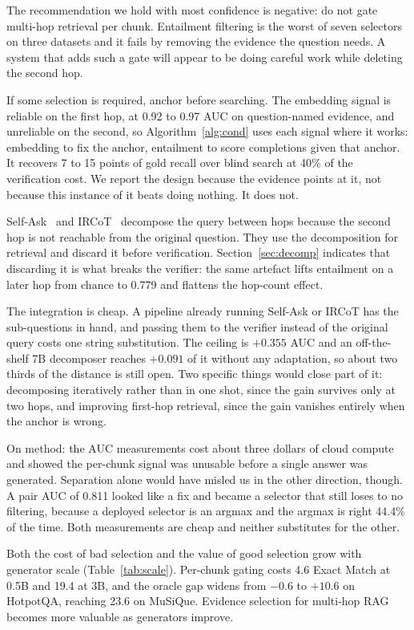 \documentclass[conference]{IEEEtran}
\begin{document}
The recommendation we hold with most confidence is negative: do not gate
multi-hop retrieval per chunk. Entailment filtering is the worst of seven
selectors on three datasets and it fails by removing the evidence the question
needs. A system that adds such a gate will appear to be doing careful work while
deleting the second hop.

If some selection is required, anchor before searching. The embedding signal is
reliable on the first hop, at 0.92 to 0.97 AUC on question-named evidence, and
unreliable on the second, so Algorithm~\ref{alg:cond} uses each signal where it
works: embedding to fix the anchor, entailment to score completions given that
anchor. It recovers 7 to 15 points of gold recall over blind search at 40\% of
the verification cost. We report the design because the evidence points at it,
not because this instance of it beats doing nothing. It does not.

Self-Ask~\cite{press2023selfask} and IRCoT~\cite{trivedi2023ircot} decompose the
query between hops because the second hop is not reachable from the original
question. They use the decomposition for retrieval and discard it before
verification. Section~\ref{sec:decomp} indicates that discarding it is what
breaks the verifier: the same artefact lifts entailment on a later hop from
chance to 0.779 and flattens the hop-count effect.

The integration is cheap. A pipeline already running Self-Ask or IRCoT has the
sub-questions in hand, and passing them to the verifier instead of the original
query costs one string substitution. The ceiling is $+0.355$ AUC and an
off-the-shelf 7B decomposer reaches $+0.091$ of it without any adaptation, so
about two thirds of the distance is still open. Two specific things would close
part of it: decomposing iteratively rather than in one shot, since the gain
survives only at two hops, and improving first-hop retrieval, since the gain
vanishes entirely when the anchor is wrong.

On method: the AUC measurements cost about three dollars of cloud compute and
showed the per-chunk signal was unusable before a single answer was generated.
Separation alone would have misled us in the other direction, though. A pair AUC
of 0.811 looked like a fix and became a selector that still loses to no
filtering, because a deployed selector is an argmax and the argmax is right
44.4\% of the time. Both measurements are cheap and neither substitutes for the
other.

Both the cost of bad selection and the value of good selection grow with
generator scale (Table~\ref{tab:scale}). Per-chunk gating costs 4.6 Exact Match
at 0.5B and 19.4 at 3B, and the oracle gap widens from $-0.6$ to $+10.6$ on
HotpotQA, reaching 23.6 on MuSiQue. Evidence selection for multi-hop RAG becomes
more valuable as generators improve.
\end{document}
